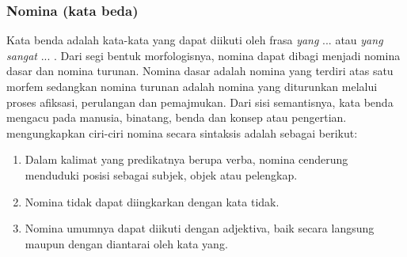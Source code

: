 \subsubsection{Nomina (kata beda)}
Kata benda adalah kata-kata yang dapat diikuti oleh frasa \emph{yang} ... atau \emph{yang sangat} ... \citep{chaer}. Dari segi bentuk morfologisnya, nomina dapat dibagi menjadi nomina dasar dan nomina turunan. Nomina dasar adalah nomina yang terdiri atas satu morfem sedangkan nomina turunan adalah nomina yang diturunkan melalui proses afiksasi, perulangan dan pemajmukan. Dari sisi semantisnya, kata benda mengacu pada manusia, binatang, benda dan konsep atau pengertian. \citet{alwi} mengungkapkan ciri-ciri nomina secara sintaksis adalah sebagai berikut:
\begin{enumerate}
	\item Dalam kalimat yang predikatnya berupa verba, nomina cenderung menduduki posisi sebagai subjek, objek atau pelengkap.
	
	\item Nomina tidak dapat diingkarkan dengan kata tidak.
	
	\item Nomina umumnya dapat diikuti dengan adjektiva, baik secara langsung maupun dengan diantarai oleh kata yang.
\end{enumerate}

